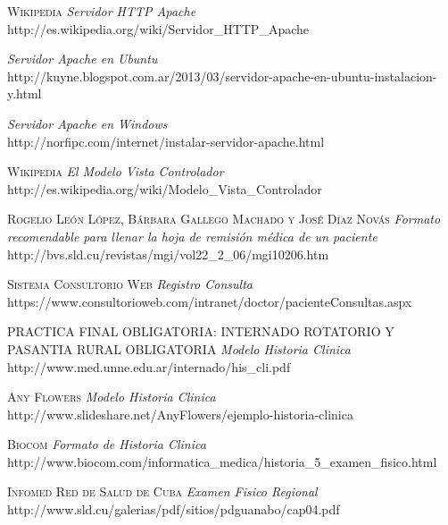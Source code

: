 \begin{thebibliography}{X}

     \textsc{Wikipedia} \textit{Servidor HTTP Apache}  \\
        http://es.wikipedia.org/wiki/Servidor\_HTTP\_Apache 

     \textit{Servidor Apache en Ubuntu}  \\
        http://kuyne.blogspot.com.ar/2013/03/servidor-apache-en-ubuntu-instalacion-y.html     

     \textit{Servidor Apache en Windows} \\ 
        http://norfipc.com/internet/instalar-servidor-apache.html

     \textsc{Wikipedia} \textit{El Modelo Vista Controlador} \\
        http://es.wikipedia.org/wiki/Modelo\_Vista\_Controlador

     \textsc{Rogelio León López, Bárbara Gallego Machado y José Díaz Novás} \textit{Formato recomendable para llenar la hoja de remisión médica de un paciente}  \\
        http://bvs.sld.cu/revistas/mgi/vol22\_2\_06/mgi10206.htm 

     \textsc{Sistema Consultorio Web} \textit{Registro Consulta} \\
        https://www.consultorioweb.com/intranet/doctor/pacienteConsultas.aspx
    
     \textsc{PRACTICA FINAL OBLIGATORIA: INTERNADO ROTATORIO Y PASANTIA RURAL OBLIGATORIA} \textit{Modelo Historia Clinica}  \\
        http://www.med.unne.edu.ar/internado/his\_cli.pdf
    
     \textsc{Any Flowers} \textit{Modelo Historia Clinica}  \\
        http://www.slideshare.net/AnyFlowers/ejemplo-historia-clinica
    
     \textsc{Biocom} \textit{Formato de Historia Clinica}  \\
        http://www.biocom.com/informatica\_medica/historia\_5\_examen\_fisico.html
    
     \textsc{Infomed Red de Salud de Cuba} \textit{Examen Fisico Regional}  \\
        http://www.sld.cu/galerias/pdf/sitios/pdguanabo/cap04.pdf
    

\end{thebibliography}
